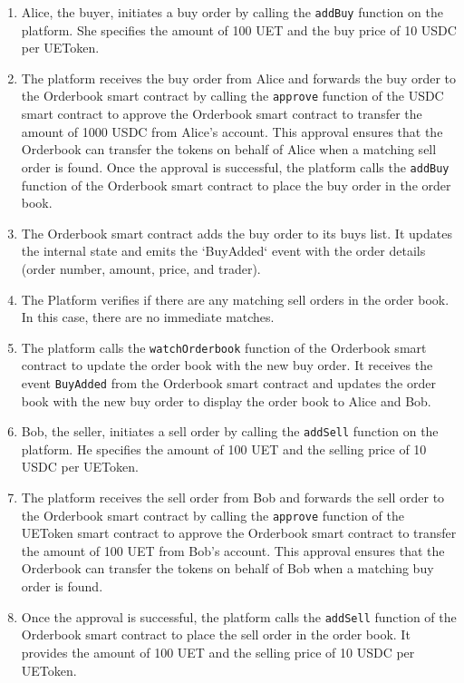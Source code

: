 \begin{enumerate}
    \item Alice, the buyer, initiates a buy order by calling the \texttt{addBuy} function on the platform. She specifies the amount of
          100 UET and the buy price of 10 USDC per UEToken.
    \item The platform receives the buy order from Alice and forwards the buy order to the Orderbook smart contract by calling the \texttt{approve} function
          of the USDC smart contract to approve the Orderbook smart contract to transfer the amount of 1000 USDC from Alice's account. This approval ensures that the Orderbook can
          transfer the tokens on behalf of Alice when a matching sell order is found.
          Once the approval is successful, the platform calls the \texttt{addBuy} function of the Orderbook smart contract to place the buy order in the order book.
    \item The Orderbook smart contract adds the buy order to its buys list. It updates the internal state and emits the `BuyAdded` event with the order details (order number, amount, price, and trader).
    \item The Platform verifies if there are any matching sell orders in the order book. In this case, there are no immediate matches.
    \item The platform calls the \texttt{watchOrderbook} function of the Orderbook smart contract to update the order book with the new buy order. It receives
          the event \texttt{BuyAdded} from the Orderbook smart contract and updates the order book with the new buy order to display the order book to Alice and Bob.
    \item Bob, the seller, initiates a sell order by calling the \texttt{addSell} function on the platform. He specifies the amount of 100 UET and the selling price of 10 USDC per UEToken.
    \item The platform receives the sell order from Bob and forwards the sell order to the Orderbook smart contract by calling the \texttt{approve} function
          of the UEToken smart contract to approve the Orderbook smart contract to transfer the amount of 100 UET from Bob's account. This approval ensures that the Orderbook can
          transfer the tokens on behalf of Bob when a matching buy order is found.
    \item Once the approval is successful, the platform calls the \texttt{addSell} function of the Orderbook smart contract to place the sell order in the order book.
          It provides the amount of 100 UET and the selling price of 10 USDC per UEToken.

\end{enumerate}

